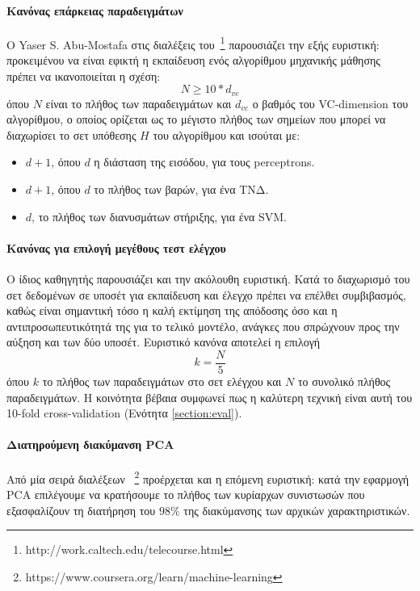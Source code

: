 \paragraph{Κανόνας επάρκειας παραδειγμάτων} Ο Yaser S. Abu-Mostafa  στις διαλέξεις του~\footnote{http://work.caltech.edu/telecourse.html} παρουσιάζει την εξής ευριστική: προκειμένου να είναι εφικτή η εκπαίδευση ενός αλγορίθμου μηχανικής μάθησης πρέπει να ικανοποιείται η σχέση: 
\begin{equation}
N \geq  10 * d_{vc}
\end{equation}
όπου $N$ είναι το πλήθος των παραδειγμάτων και $d_{vc}$ ο βαθμός του VC-dimension του αλγορίθμου, ο οποίος ορίζεται ως το μέγιστο πλήθος των σημείων που μπορεί να διαχωρίσει το σετ υπόθεσης $H$ του αλγορίθμου και ισούται με:
\begin{itemize}
	\item $d+1$, όπου $d$ η διάσταση της εισόδου, για τους perceptrons.
	\item $d+1$, όπου $d$ το πλήθος των βαρών, για ένα \gls{ΤΝΔ}.
	\item $d$, το πλήθος των διανυσμάτων στήριξης, για ένα \gls{SVM}.
\end{itemize}  


\paragraph{Κανόνας για επιλογή μεγέθους τεστ ελέγχου} Ο ίδιος καθηγητής παρουσιάζει και την ακόλουθη ευριστική. Κατά το διαχωρισμό του σετ δεδομένων σε υποσέτ για εκπαίδευση και έλεγχο πρέπει να επέλθει συμβιβασμός, καθώς είναι σημαντική τόσο η καλή εκτίμηση της απόδοσης όσο και η αντιπροσωπευτικότητά της για το τελικό μοντέλο, ανάγκες που σπρώχνουν προς την αύξηση και των δύο υποσέτ. Ευριστικό κανόνα αποτελεί η επιλογή 
\begin{equation}
k =  \frac{N}{5}
\end{equation}
όπου $k$ το πλήθος των παραδειγμάτων στο σετ ελέγχου και $N$ το συνολικό πλήθος παραδειγμάτων. Η κοινότητα βέβαια συμφωνεί πως η καλύτερη τεχνική είναι αυτή του 10-fold cross-validation (Ενότητα \ref{section:eval}). 

\paragraph{Διατηρούμενη διακύμανση \gls{PCA}} Από μία σειρά διαλέξεων ~\footnote{https://www.coursera.org/learn/machine-learning} προέρχεται και η επόμενη ευριστική: κατά την εφαρμογή PCΑ επιλέγουμε να κρατήσουμε το πλήθος των κυρίαρχων συνιστωσών που εξασφαλίζουν τη διατήρηση του $98\%$ της διακύμανσης των αρχικών χαρακτηριστικών.

